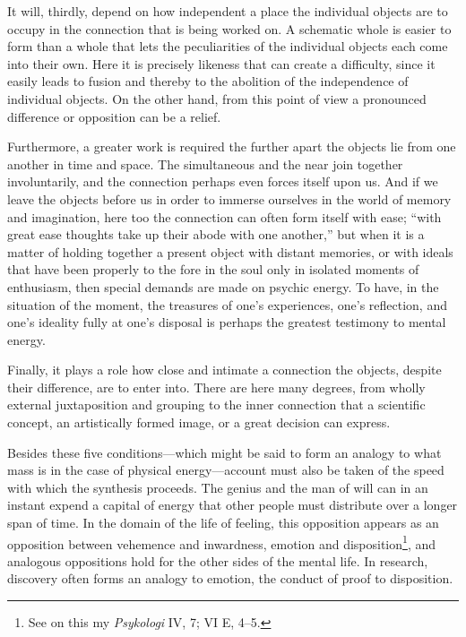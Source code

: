 \documentclass[12pt,a4paper]{book}
\newcommand{\opage}[1]{\marginnote{\footnotesize\textit{[#1]}}}
\begin{document}
It will, thirdly, depend on how independent a place the individual
objects are to occupy in the connection that is being worked on. A
schematic whole is easier to form than a whole that lets the
peculiarities of the individual objects each come into their own. Here
it is precisely likeness that can create a difficulty, since it easily
leads to fusion and thereby to the abolition of the independence of
individual objects. On the other hand, from this point of view a
pronounced difference or opposition can be a relief.

Furthermore, a greater work is required the further apart the objects
lie from one another in time and space. The simultaneous and the near
join together involuntarily, and the connection perhaps even forces
itself upon us. And if we leave the objects before us in order to
immerse ourselves in the world of memory and imagination, here too the
connection can often form itself with ease; ``with great ease thoughts
take up their abode with one another,'' but when it is a matter of
holding together a present object with distant memories, or with ideals
that have been properly to the fore in the soul only in isolated moments
of enthusiasm, then special demands are made on psychic energy. To have,
in the situation of the moment, the treasures of one's experiences,
one's reflection, and one's ideality fully at one's disposal is perhaps
the greatest testimony to mental energy.

Finally, it plays a role how close and intimate a connection the
objects, despite their difference, are to enter into. There are here
many degrees, from wholly external juxtaposition and grouping to the
inner connection that a scientific concept, an artistically formed
image, or a great decision can express.

Besides these five conditions---which might be said to form an analogy
to what mass is in the case of physical energy---account must also be
taken of the speed with which the synthesis proceeds. The genius and the
man of will can in an instant expend a capital of energy that other
people must \opage{6}distribute over a longer span of time. In the domain of the
life of feeling, this opposition appears as an opposition between
vehemence and inwardness, emotion and disposition\footnote{See on this
my \emph{Psykologi} IV, 7; VI E, 4--5.}, and analogous oppositions hold
for the other sides of the mental life. In research, discovery often
forms an analogy to emotion, the conduct of proof to disposition.
\end{document}
